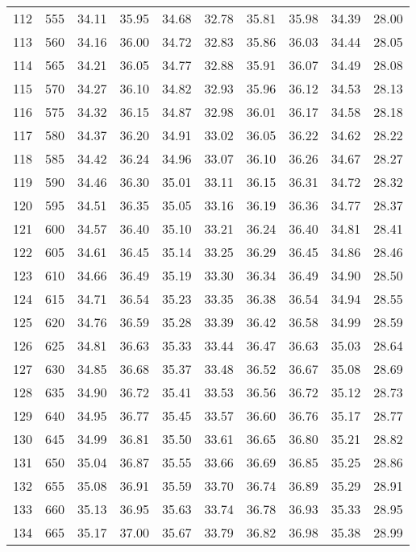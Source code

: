 \begin{longtable}{rrllllllll}
112 & 555 & 34.11 & 35.95 & 34.68 & 32.78 & 35.81 & 35.98 & 34.39 & 28.00 \\ 
113 & 560 & 34.16 & 36.00 & 34.72 & 32.83 & 35.86 & 36.03 & 34.44 & 28.05 \\ 
114 & 565 & 34.21 & 36.05 & 34.77 & 32.88 & 35.91 & 36.07 & 34.49 & 28.08 \\ 
115 & 570 & 34.27 & 36.10 & 34.82 & 32.93 & 35.96 & 36.12 & 34.53 & 28.13 \\ 
116 & 575 & 34.32 & 36.15 & 34.87 & 32.98 & 36.01 & 36.17 & 34.58 & 28.18 \\ 
117 & 580 & 34.37 & 36.20 & 34.91 & 33.02 & 36.05 & 36.22 & 34.62 & 28.22 \\ 
118 & 585 & 34.42 & 36.24 & 34.96 & 33.07 & 36.10 & 36.26 & 34.67 & 28.27 \\ 
119 & 590 & 34.46 & 36.30 & 35.01 & 33.11 & 36.15 & 36.31 & 34.72 & 28.32 \\ 
120 & 595 & 34.51 & 36.35 & 35.05 & 33.16 & 36.19 & 36.36 & 34.77 & 28.37 \\ 
121 & 600 & 34.57 & 36.40 & 35.10 & 33.21 & 36.24 & 36.40 & 34.81 & 28.41 \\ 
122 & 605 & 34.61 & 36.45 & 35.14 & 33.25 & 36.29 & 36.45 & 34.86 & 28.46 \\ 
123 & 610 & 34.66 & 36.49 & 35.19 & 33.30 & 36.34 & 36.49 & 34.90 & 28.50 \\ 
124 & 615 & 34.71 & 36.54 & 35.23 & 33.35 & 36.38 & 36.54 & 34.94 & 28.55 \\ 
125 & 620 & 34.76 & 36.59 & 35.28 & 33.39 & 36.42 & 36.58 & 34.99 & 28.59 \\ 
126 & 625 & 34.81 & 36.63 & 35.33 & 33.44 & 36.47 & 36.63 & 35.03 & 28.64 \\ 
127 & 630 & 34.85 & 36.68 & 35.37 & 33.48 & 36.52 & 36.67 & 35.08 & 28.69 \\ 
128 & 635 & 34.90 & 36.72 & 35.41 & 33.53 & 36.56 & 36.72 & 35.12 & 28.73 \\ 
129 & 640 & 34.95 & 36.77 & 35.45 & 33.57 & 36.60 & 36.76 & 35.17 & 28.77 \\ 
130 & 645 & 34.99 & 36.81 & 35.50 & 33.61 & 36.65 & 36.80 & 35.21 & 28.82 \\ 
131 & 650 & 35.04 & 36.87 & 35.55 & 33.66 & 36.69 & 36.85 & 35.25 & 28.86 \\ 
132 & 655 & 35.08 & 36.91 & 35.59 & 33.70 & 36.74 & 36.89 & 35.29 & 28.91 \\ 
133 & 660 & 35.13 & 36.95 & 35.63 & 33.74 & 36.78 & 36.93 & 35.33 & 28.95 \\ 
134 & 665 & 35.17 & 37.00 & 35.67 & 33.79 & 36.82 & 36.98 & 35.38 & 28.99 \\ 

\end{longtable}
